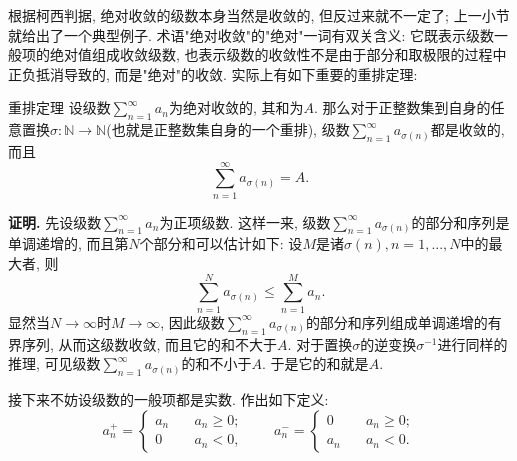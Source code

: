 根据柯西判据, 绝对收敛的级数本身当然是收敛的, 但反过来就不一定了; 上一小节就给出了一个典型例子. 术语"绝对收敛"的"绝对"一词有双关含义: 它既表示级数一般项的绝对值组成收敛级数, 也表示级数的收敛性不是由于部分和取极限的过程中正负抵消导致的, 而是"绝对"的收敛. 实际上有如下重要的重排定理:

\begin{theorem}{重排定理}
设级数$\sum_{n=1}^\infty a_n$为绝对收敛的, 其和为$A$. 那么对于正整数集到自身的任意置换$\sigma:\mathbb{N}\to\mathbb{N}$(也就是正整数集自身的一个重排), 级数$\sum_{n=1}^\infty a_{\sigma(n)}$都是收敛的, 而且
$$
\sum_{n=1}^\infty a_{\sigma(n)}=A.
$$
\end{theorem}

\textbf{证明.} 先设级数$\sum_{n=1}^\infty a_n$为正项级数. 这样一来, 级数$\sum_{n=1}^\infty a_{\sigma(n)}$的部分和序列是单调递增的, 而且第$N$个部分和可以估计如下: 设$M$是诸$\sigma(n),n=1,...,N$中的最大者, 则
$$
\sum_{n=1}^Na_{\sigma(n)}\leq\sum_{n=1}^{M}a_n.
$$
显然当$N\to\infty$时$M\to\infty$, 因此级数$\sum_{n=1}^\infty a_{\sigma(n)}$的部分和序列组成单调递增的有界序列, 从而这级数收敛, 而且它的和不大于$A$. 对于置换$\sigma$的逆变换$\sigma^{-1}$进行同样的推理, 可见级数$\sum_{n=1}^\infty a_{\sigma(n)}$的和不小于$A$. 于是它的和就是$A$.

接下来不妨设级数的一般项都是实数. 作出如下定义:
$$
a_n^+=\left\{\begin{array}{cc}
{a_n}\quad &a_n\geq0;\\
0\quad &a_n<0,
\end{array}\right.
\quad\quad
a_n^-=\left\{\begin{array}{cc}
0\quad &a_n\geq0;\\
a_n\quad &a_n<0.
\end{array}\right.
$$